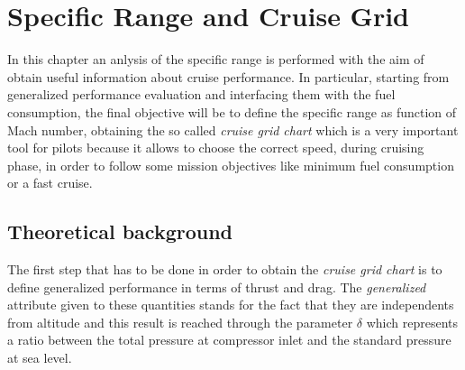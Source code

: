 \chapter{Specific Range and Cruise Grid}
In this chapter an anlysis of the specific range is performed with the aim of obtain useful information about cruise performance. 
%
In particular, starting from generalized performance evaluation and interfacing them with the fuel consumption, the final objective will be to define the specific range as function of Mach number, obtaining the so called \emph{cruise grid chart} which is a very important tool for pilots because it allows to choose the correct speed, during cruising phase, in order to follow some mission objectives like minimum fuel consumption or a fast cruise.
%
\section{Theoretical background}
The first step that has to be done in order to obtain the \emph{cruise grid chart} is to define generalized performance in terms of thrust and drag. The \emph{generalized} attribute given to these quantities stands for the fact that they are independents from altitude and this result is reached through the parameter $\delta$ which represents a ratio between the total pressure at compressor inlet and  the standard pressure at sea level. 

